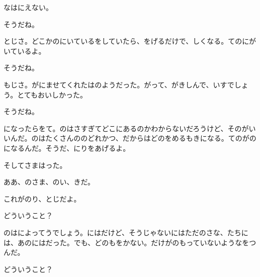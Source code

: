 なはにえない。

そうだね。

とじさ。どこかのにいているをしていたら、をげるだけで、しくなる。てのにがいているよ。

そうだね。

もじさ。がにませてくれたはのようだった。がって、がきしんで、いすでしょう。とてもおいしかった。

そうだね。

になったらをて。のはさすぎてどこにあるのかわからないだろうけど、そのがいいんだ。のはたくさんののどれかつ、だからはどのをめるもきになる。てのがのになるんだ。そうだ、にりをあげるよ。

そしてさまはった。

ああ、のさま、のい、きだ。

これがのり、とじだよ。

どういうこと？

のはによってうでしょう。にはだけど、そうじゃないにはただのさな、たちには、あのにはだった。でも、どのもをかない。だけがのもっていないようなをつんだ。

どういうこと？

